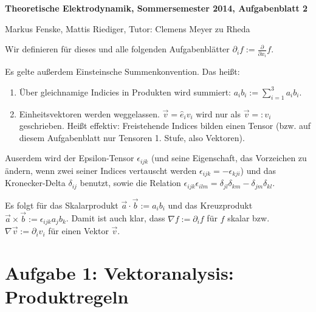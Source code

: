 \documentclass[a4paper,german,12pt,smallheadings]{scrartcl}
\begin{document}
\allowdisplaybreaks %
\begin{center}
\bfseries %
\sffamily %
\vspace{-40pt}
Theoretische Elektrodynamik, Sommersemester 2014, Aufgabenblatt 2

Markus Fenske, Mattis Riediger, Tutor: Clemens Meyer zu Rheda
\vspace{-10pt}
\end{center}

Wir definieren für dieses und alle folgenden Aufgabenblätter $\partial_i f :=
\frac{\partial}{\partial x_i} f$.

Es gelte außerdem Einsteinsche Summenkonvention. Das heißt:

\begin{enumerate}
  \item
    Über gleichnamige Indicies in Produkten wird summiert: $a_ib_i := \sum_{i=1}^3 a_ib_i$.
  \item
    Einheitsvektoren werden weggelassen. $\vec{v} = \hat{e}_iv_i$ wird nur als
    $\vec{v} =: v_i$ geschrieben. Heißt effektiv: Freistehende Indices bilden einen Tensor
    (bzw. auf diesem Aufgabenblatt nur Tensoren 1. Stufe, also Vektoren).
\end{enumerate}

Auserdem wird der Epsilon-Tensor $\epsilon_{ijk}$ (und seine Eigenschaft, das
Vorzeichen zu ändern, wenn zwei seiner Indices vertauscht werden
$\epsilon_{ijk} = -\epsilon_{kji}$) und das Kronecker-Delta
$\delta_{ij}$ benutzt, sowie die Relation $\epsilon_{ijk} \epsilon_{ilm} =
\delta_{jl}\delta_{km} - \delta_{jm}\delta_{kl}$.

Es folgt für das Skalarprodukt $\vec{a} \cdot \vec{b} := a_ib_i$ und das
Kreuzprodukt $\vec{a} \times \vec{b} := \epsilon_{ijk} a_j b_k$.  Damit ist auch
klar, dass $\nabla f := \partial_i f$ für $f$ skalar bzw. $\nabla \vec{v} :=
\partial_i v_i$ für einen Vektor $\vec{v}$.

\section*{Aufgabe 1: Vektoranalysis: Produktregeln}
\end{document}
